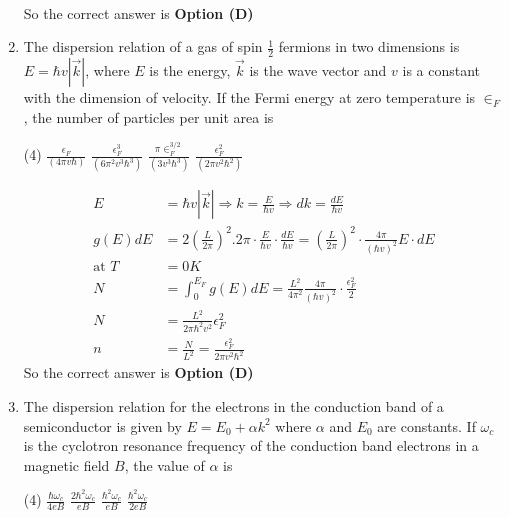 \begin{enumerate}
\begin{answer}
\begin{align*}
		\end{align*}
		So the correct answer is \textbf{Option (D)}
	\end{answer}
	\item The dispersion relation of a gas of spin $\frac{1}{2}$ fermions in two dimensions is $E=\hbar v|\vec{k}|$, where $E$ is the energy, $\vec{k}$ is the wave vector and $v$ is a constant with the dimension of velocity. If the Fermi energy at zero temperature is $\in_{F}$, the number of particles per unit area is
	{}
	\begin{tasks}(4)
		\task[\textbf{A.}] $\frac{\epsilon_{F}}{(4 \pi v \hbar)}$
		\task[\textbf{B.}] $\frac{\epsilon_{F}^{3}}{\left(6 \pi^{2} v^{3} \hbar^{3}\right)}$
		\task[\textbf{C.}] $\frac{\pi \in_{F}^{3 / 2}}{\left(3 v^{3} \hbar^{3}\right)}$
		\task[\textbf{D.}] $\frac{\epsilon_{F}^{2}}{\left(2 \pi v^{2} \hbar^{2}\right)}$
	\end{tasks}
	\begin{answer}
		\begin{align*}
		E&=\hbar v|\vec{k}| \Rightarrow k=\frac{E}{\hbar v} \Rightarrow d k=\frac{d E}{\hbar v}\\
		g(E) d E&=2\left(\frac{L}{2 \pi}\right)^{2} .2 \pi \cdot \frac{E}{\hbar v} \cdot \frac{d E}{\hbar v}=\left(\frac{L}{2 \pi}\right)^{2} \cdot \frac{4 \pi}{(\hbar v)^{2}} E \cdot d E\\
		\text{at }T&=0 K\\
		N&=\int_{0}^{E_{F}} g(E) d E=\frac{L^{2}}{4 \pi^{2}} \frac{4 \pi}{(\hbar v)^{2}} \cdot \frac{\epsilon_{F}^{2}}{2}\\
		N&=\frac{L^{2}}{2 \pi \hbar^{2} v^{2}} \epsilon_{F}^{2}\\
		n&=\frac{N}{L^{2}}=\frac{\epsilon_{F}^{2}}{2 \pi v^{2} \hbar^{2}}
		\end{align*}
		So the correct answer is \textbf{Option (D)}
	\end{answer}
	\item The dispersion relation for the electrons in the conduction band of a semiconductor is given by $E=E_{0}+\alpha k^{2}$ where $\alpha$ and $E_{0}$ are constants. If $\omega_{c}$ is the cyclotron resonance frequency of the conduction band electrons in a magnetic field $B$, the value of $\alpha$ is
	{}
	\begin{tasks}(4)
		\task[\textbf{A.}] $\frac{\hbar \omega_{c}}{4 e B}$
		\task[\textbf{B.}] $\frac{2 \hbar^{2} \omega_{c}}{e B}$
		\task[\textbf{C.}] $\frac{\hbar^{2} \omega_{c}}{e B}$
		\task[\textbf{D.}]  $\frac{\hbar^{2} \omega_{c}}{2 e B}$

\end{tasks}
\end{enumerate}
